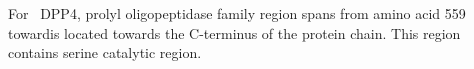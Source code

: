 For~ DPP4, prolyl oligopeptidase family region spans from amino acid 559 towardis located towards the C-terminus of the protein chain. This region contains serine catalytic region.  